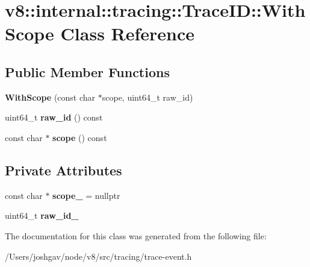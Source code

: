 \hypertarget{classv8_1_1internal_1_1tracing_1_1_trace_i_d_1_1_with_scope}{}\section{v8\+:\+:internal\+:\+:tracing\+:\+:Trace\+ID\+:\+:With\+Scope Class Reference}
\label{classv8_1_1internal_1_1tracing_1_1_trace_i_d_1_1_with_scope}
\subsection*{Public Member Functions}
\begin{DoxyCompactItemize}
\item 
{\bfseries With\+Scope} (const char $\ast$scope, uint64\+\_\+t raw\+\_\+id)\hypertarget{classv8_1_1internal_1_1tracing_1_1_trace_i_d_1_1_with_scope_ad760cc569a35f3a48ef15f750c600bc4}{}\label{classv8_1_1internal_1_1tracing_1_1_trace_i_d_1_1_with_scope_ad760cc569a35f3a48ef15f750c600bc4}

\item 
uint64\+\_\+t {\bfseries raw\+\_\+id} () const \hypertarget{classv8_1_1internal_1_1tracing_1_1_trace_i_d_1_1_with_scope_ac801a0ad354f7daa756e66f33f1cf91b}{}\label{classv8_1_1internal_1_1tracing_1_1_trace_i_d_1_1_with_scope_ac801a0ad354f7daa756e66f33f1cf91b}

\item 
const char $\ast$ {\bfseries scope} () const \hypertarget{classv8_1_1internal_1_1tracing_1_1_trace_i_d_1_1_with_scope_aa3fda8e1224650d55ab1a3c070d24f9d}{}\label{classv8_1_1internal_1_1tracing_1_1_trace_i_d_1_1_with_scope_aa3fda8e1224650d55ab1a3c070d24f9d}

\end{DoxyCompactItemize}
\subsection*{Private Attributes}
\begin{DoxyCompactItemize}
\item 
const char $\ast$ {\bfseries scope\+\_\+} = nullptr\hypertarget{classv8_1_1internal_1_1tracing_1_1_trace_i_d_1_1_with_scope_ac27f964be565b5356d61b011ea76e6a7}{}\label{classv8_1_1internal_1_1tracing_1_1_trace_i_d_1_1_with_scope_ac27f964be565b5356d61b011ea76e6a7}

\item 
uint64\+\_\+t {\bfseries raw\+\_\+id\+\_\+}\hypertarget{classv8_1_1internal_1_1tracing_1_1_trace_i_d_1_1_with_scope_a53246c55b1dadfa96ea1e12b523bb282}{}\label{classv8_1_1internal_1_1tracing_1_1_trace_i_d_1_1_with_scope_a53246c55b1dadfa96ea1e12b523bb282}

\end{DoxyCompactItemize}


The documentation for this class was generated from the following file\+:\begin{DoxyCompactItemize}
\item 
/\+Users/joshgav/node/v8/src/tracing/trace-\/event.\+h\end{DoxyCompactItemize}
